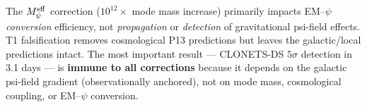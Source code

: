 \documentclass[aps,prd,twocolumn,superscriptaddress,nofootinbib]{revtex4-2}
\newcommand{\Meff}{M_\psi^{\rm eff}}
\begin{document}
\begin{resultbox}[title={W3i5 Bottom Line for P12+P13}]
The $\Meff$ correction ($10^{12}\times$ mode mass increase) primarily
impacts EM--$\psi$ \emph{conversion} efficiency, not \emph{propagation}
or \emph{detection} of gravitational psi-field effects. T1 falsification
removes cosmological P13 predictions but leaves the galactic/local
predictions intact. The most important result --- CLONETS-DS $5\sigma$
detection in 3.1 days --- is \textbf{immune to all corrections} because
it depends on the galactic psi-field gradient (observationally anchored),
not on mode mass, cosmological coupling, or EM--$\psi$ conversion.
\end{resultbox}

\end{document}
